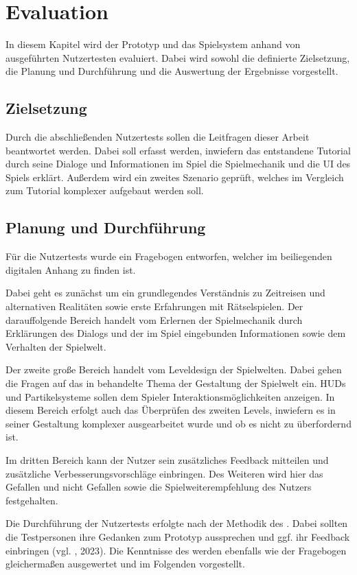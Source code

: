 \chapter{Evaluation}\label{sec:test}
In diesem Kapitel wird der Prototyp und das Spielsystem anhand von ausgeführten Nutzertesten evaluiert. Dabei wird sowohl die definierte Zielsetzung, die Planung und Durchführung und die Auswertung der Ergebnisse vorgestellt.

\section{Zielsetzung}
Durch die abschließenden Nutzertests sollen die Leitfragen dieser Arbeit beantwortet werden. Dabei soll erfasst werden, inwiefern das entstandene Tutorial durch seine Dialoge und Informationen im Spiel die Spielmechanik und die \ac{UI} des Spiels erklärt. Außerdem wird ein zweites Szenario geprüft, welches im Vergleich zum Tutorial komplexer aufgebaut werden soll. 

\section{Planung und Durchführung}
Für die Nutzertests wurde ein Fragebogen entworfen, welcher im beiliegenden digitalen Anhang zu finden ist. 

Dabei geht es zunächst um ein grundlegendes Verständnis zu Zeitreisen und alternativen Realitäten sowie erste Erfahrungen mit Rätselspielen. 
Der darauffolgende Bereich handelt vom Erlernen der Spielmechanik durch Erklärungen des Dialogs und der im Spiel eingebunden Informationen sowie dem Verhalten der Spielwelt.

Der zweite große Bereich handelt vom Leveldesign der Spielwelten. Dabei gehen die Fragen auf das in  behandelte Thema der Gestaltung der Spielwelt ein. \ac{HUD}s und Partikelsysteme sollen dem Spieler Interaktionsmöglichkeiten anzeigen. In diesem Bereich erfolgt auch das Überprüfen des zweiten Levels, inwiefern es in seiner Gestaltung komplexer ausgearbeitet wurde und ob es nicht zu überfordernd ist.

Im dritten Bereich kann der Nutzer sein zusätzliches Feedback mitteilen und zusätzliche Verbesserungsvorschläge einbringen. Des Weiteren wird hier das Gefallen und nicht Gefallen sowie die Spielweiterempfehlung des Nutzers festgehalten.

Die Durchführung der Nutzertests erfolgte nach der Methodik des . Dabei sollten die Testpersonen ihre Gedanken zum Prototyp aussprechen und ggf. ihr Feedback einbringen (vgl. \cite{usabilityde_gmbh__co_kg_concurrent_2023}, 2023). Die Kenntnisse des  werden ebenfalls wie der Fragebogen gleichermaßen ausgewertet und im Folgenden  vorgestellt.

